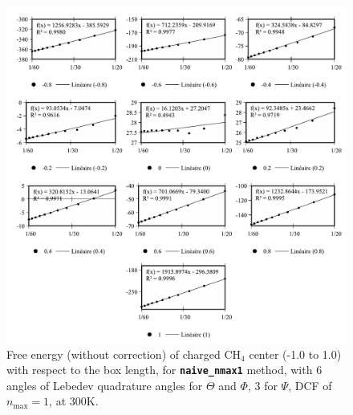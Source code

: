 \begin{figure}[!bh]
\begin{centering}
\includegraphics[width=0.95\columnwidth]{_figure/results/ch4_nmax1_lmn}
\par\end{centering}
\caption[Original free energy of charged $\mathrm{C}\mathrm{H}_{4}$, ``naive\_nmax1'']{Free energy (without correction) of charged $\mathrm{C}\mathrm{H}_{4}$
center (-1.0 to 1.0) with respect to the box length, for \texttt{\textbf{naive\_nmax1}}
method, with 6 angles of Lebedev quadrature angles for $\Theta$ and
$\Phi$, 3 for $\Psi$, DCF of $n_{\max}=1$, at 300K.\label{fig:ch4_nmax1_lmn}}
\end{figure}

